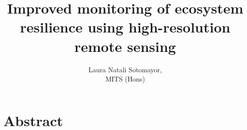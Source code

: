 \documentclass{thesis}
\title{Improved monitoring of ecosystem resilience using high-resolution remote sensing}
\author{Laura Natali Sotomayor, \\
MITS (Hons)}
\begin{document}
\maketitle
 
\chapter*{Abstract}




\end{document}
